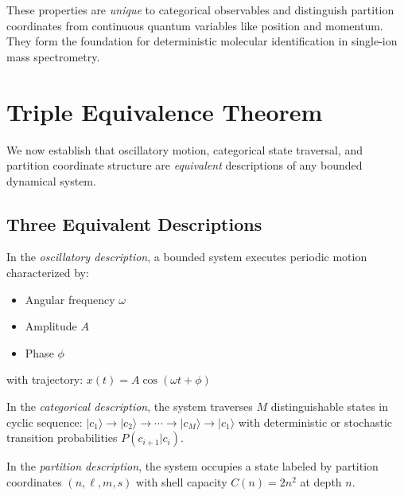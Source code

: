 These properties are \emph{unique} to categorical observables and distinguish partition coordinates from continuous quantum variables like position and momentum. They form the foundation for deterministic molecular identification in single-ion mass spectrometry.



\section{Triple Equivalence Theorem}
\label{sec:triple}

We now establish that oscillatory motion, categorical state traversal, and partition coordinate structure are \emph{equivalent} descriptions of any bounded dynamical system.

\subsection{Three Equivalent Descriptions}

\begin{definition}
\label{def:oscillatory}
In the \emph{oscillatory description}, a bounded system executes periodic motion characterized by:
\begin{itemize}
    \item Angular frequency $\omega$
    \item Amplitude $A$
    \item Phase $\phi$
\end{itemize}
with trajectory:
$
x(t) = A \cos(\omega t + \phi)
$
\end{definition}

\begin{definition}
\label{def:categorical_desc}
In the \emph{categorical description}, the system traverses $M$ distinguishable states in cyclic sequence:
$
|c_1\rangle \to |c_2\rangle \to \cdots \to |c_M\rangle \to |c_1\rangle
$
with deterministic or stochastic transition probabilities $P(c_{i+1}|c_i)$.
\end{definition}

\begin{definition}
\label{def:partition_desc}
In the \emph{partition description}, the system occupies a state labeled by partition coordinates $(n, \ell, m, s)$ with shell capacity $C(n) = 2n^2$ at depth $n$.
\end{definition}


